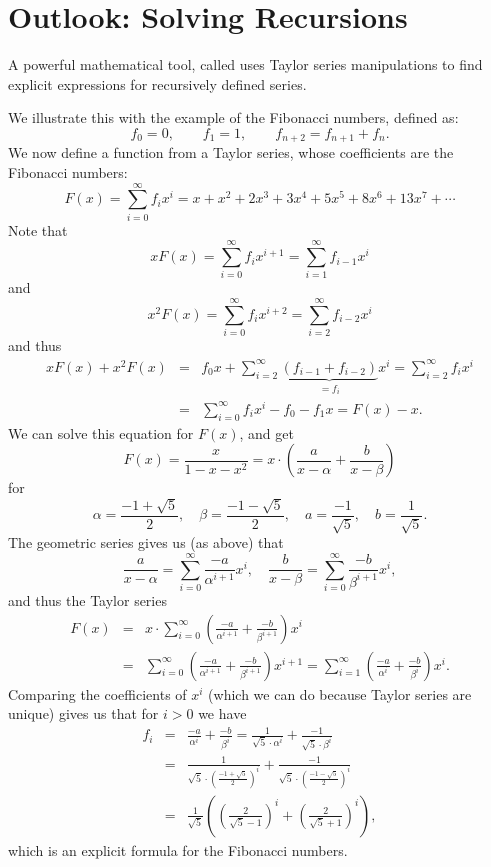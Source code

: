 
\section{Outlook: Solving Recursions}
\label{solvfibo}

A powerful mathematical tool, called  uses
Taylor series manipulations to find explicit expressions for recursively
defined series. 

We illustrate this with the example of the Fibonacci
numbers, defined as:
\[
f_0=0,\qquad f_1=1,\qquad f_{n+2}=f_{n+1}+f_n.
\]
We now define a function from a Taylor series, whose coefficients are the
Fibonacci numbers:
\[
F(x)=\sum_{i=0}^\infty f_i x^i=x+x^2+2x^3+3x^4+5x^5+8x^6+13x^7+\cdots
\]
Note that
\[
xF(x)=\sum_{i=0}^\infty f_i x^{i+1}=\sum_{i=1}^\infty f_{i-1} x^i
\]
and
\[
x^2F(x)=\sum_{i=0}^\infty f_i x^{i+2}=\sum_{i=2}^\infty f_{i-2} x^i
\]
and thus
\begin{eqnarray*}
xF(x)+x^2F(x)&=&f_0x+\sum_{i=2}^\infty \underbrace{(f_{i-1}+f_{i-2})}_{=f_i} x^i
=\sum_{i=2}^\infty f_i x^i\\
&=&\sum_{i=0}^\infty f_i x^i-f_0-f_1x=F(x)-x.
\end{eqnarray*}
We can solve this equation for $F(x)$, and get
\[
F(x)=\frac{x}{1-x-x^2}=x\cdot\left(\frac{a}{x-\alpha}+\frac{b}{x-\beta}\right)
\]
for
\[
\alpha=\frac{-1+\sqrt{5}}{2},\quad\beta=\frac{-1-\sqrt{5}}{2},\quad
a=\frac{-1}{\sqrt{5}},\quad b=\frac{1}{\sqrt{5}}.
\]
The geometric series gives us (as above) that 
\[
\frac{a}{x-\alpha}=\sum_{i=0}^\infty \frac{-a}{\alpha^{i+1}}x^i,\quad
\frac{b}{x-\beta}=\sum_{i=0}^\infty \frac{-b}{\beta^{i+1}}x^i,
\]
and thus the Taylor series
\begin{eqnarray*}
F(x)&=& x\cdot
\sum_{i=0}^\infty\left(\frac{-a}{\alpha^{i+1}}+\frac{-b}{\beta^{i+1}}\right)x^i\\
&=&
\sum_{i=0}^\infty\left(\frac{-a}{\alpha^{i+1}}+\frac{-b}{\beta^{i+1}}\right)x^{i+1}
=\sum_{i=1}^\infty\left(\frac{-a}{\alpha^{i}}+\frac{-b}{\beta^{i}}\right)x^{i}.
\end{eqnarray*}
Comparing the coefficients of $x^i$ (which we can do because Taylor series
are unique) gives us that for $i>0$ we have
\begin{eqnarray*}
f_i&=&\frac{-a}{\alpha^{i}}+\frac{-b}{\beta^{i}}
=
\frac{1}{\sqrt{5}\cdot \alpha^i}+\frac{-1}{\sqrt{5}\cdot \beta^i}\\
&=&
\frac{1}{\sqrt{5}\cdot \left(\frac{-1+\sqrt{5}}{2}\right)^i}
+\frac{-1}{\sqrt{5}\cdot \left(\frac{-1-\sqrt{5}}{2}\right)^i}\\
&=&\frac{1}{\sqrt{5}}\left(\left(\frac{2}{\sqrt{5}-1}\right)^i+\left(\frac{2}{\sqrt{5}+1}\right)^i\right),
\end{eqnarray*}
which is an explicit formula for the Fibonacci numbers.
